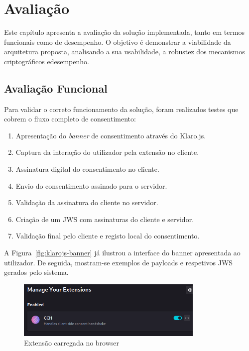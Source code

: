 \chapter{Avaliação}
\label{cap:avaliacao}

Este capítulo apresenta a avaliação da solução implementada, tanto em termos funcionais como de desempenho. O objetivo é demonstrar a viabilidade da arquitetura proposta, analisando a sua usabilidade, a robustez dos mecanismos criptográficos edesempenho.

\section{Avaliação Funcional}

Para validar o correto funcionamento da solução, foram realizados testes que cobrem o fluxo completo de consentimento:

\begin{enumerate}
    \item Apresentação do \textit{banner} de consentimento através do Klaro.js.
    \item Captura da interação do utilizador pela extensão no cliente.
    \item Assinatura digital do consentimento no cliente.
    \item Envio do consentimento assinado para o servidor.
    \item Validação da assinatura do cliente no servidor.
    \item Criação de um JWS com assinaturas do cliente e servidor.
    \item Validação final pelo cliente e registo local do consentimento.
\end{enumerate}

A Figura~\ref{fig:klarojs-banner} já ilustrou a interface do banner apresentada ao utilizador.  
De seguida, mostram-se exemplos de payloads e respetivos JWS gerados pelo sistema.

\begin{figure}[h]
    \centering
	\includegraphics[width=0.8\textwidth]{images/cch.png}
    \caption{Extensão carregada no browser}
\end{figure}

